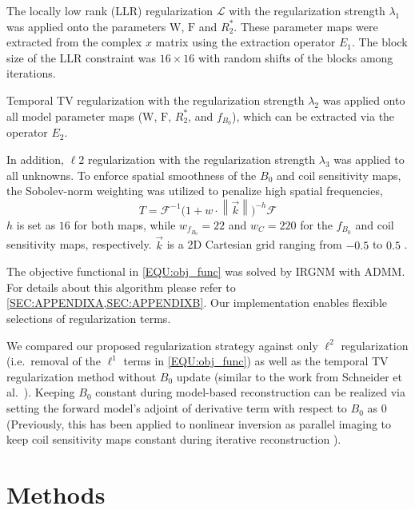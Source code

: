 \documentclass[journal,twoside,web]{ieeecolor}
\newcommand*{\norm}[1]{\left\lVert#1\right\rVert}
\begin{document}
The locally low rank (LLR) regularization $\mathcal{L}$ with the regularization strength $\lambda_1$
was applied onto the parameters $\mathrm{W}$, $\mathrm{F}$ and $R_2^*$. 
These parameter maps were extracted from the complex $x$ matrix using the extraction operator $E_1$. 
The block size of the LLR constraint was $16 \times 16$ 
with random shifts of the blocks among iterations.

Temporal TV regularization \cite{feng_2014_grasp} 
with the regularization strength $\lambda_2$ was applied onto 
all model parameter maps ($\mathrm{W}$, $\mathrm{F}$, $R_2^*$, and $f_{B_0}$), 
which can be extracted via the operator $E_2$.

In addition, $\ell2$ regularization with the regularization strength $\lambda_3$ 
was applied to all unknowns. 
To enforce spatial smoothness of the $B_0$ and coil sensitivity maps, 
the Sobolev-norm weighting \cite{uecker_2008_nlinv} 
was utilized to penalize high spatial frequencies, 
\begin{equation}
	T = \mathcal{F}^{-1} \bigg(1 + w \cdot \norm{\vec{k}} \bigg)^{-h} \mathcal{F}
\end{equation}
$h$ is set as $16$ for both maps, 
while $w_{f_{B_0}} = 22$ and $w_{C} = 220$ for the $f_{B_0}$ and coil sensitivity maps, 
respectively. $\vec{k}$ is a 2D Cartesian grid ranging from $-0.5$ to $0.5$ 
\cite{tan_2019_mobawf}.

The objective functional in \cref{EQU:obj_func} was solved by IRGNM with ADMM. 
For details about this algorithm please refer to 
\cref{SEC:APPENDIXA,SEC:APPENDIXB}. 
Our implementation enables flexible selections of regularization terms. 

We compared our proposed regularization strategy against only $\ell^2$ regularization 
(i.e.~removal of the $\ell^1$ terms in \cref{EQU:obj_func}) 
as well as the temporal TV regularization method 
without $B_0$ update (similar to the work from Schneider et al.~\cite{schneider_2020_mobawfr2s}). 
Keeping $B_0$ constant during model-based reconstruction can be realized via 
setting the forward model's adjoint of derivative term with respect to $B_0$ as 0 
(Previously, this has been applied to nonlinear inversion as parallel imaging to 
keep coil sensitivity maps constant during iterative reconstruction \cite{uecker_2008_nlinv}).

\section{Methods}
\end{document}
